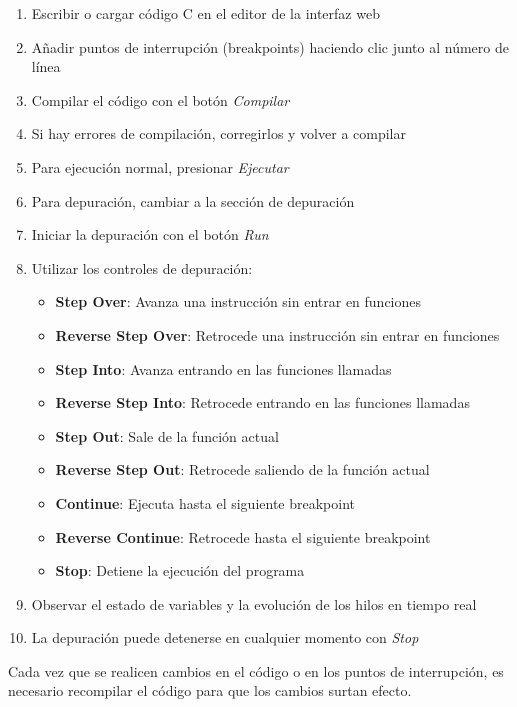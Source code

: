 \begin{enumerate}
    \item Escribir o cargar código C en el editor de la interfaz web
    \item Añadir puntos de interrupción (breakpoints) haciendo clic junto al número de línea
    \item Compilar el código con el botón \textit{Compilar}
    \item Si hay errores de compilación, corregirlos y volver a compilar
    \item Para ejecución normal, presionar \textit{Ejecutar}
    \item Para depuración, cambiar a la sección de depuración
    \item Iniciar la depuración con el botón \textit{Run}
    \item Utilizar los controles de depuración:
    \begin{itemize}
        \item \textbf{Step Over}: Avanza una instrucción sin entrar en funciones
        \item \textbf{Reverse Step Over}: Retrocede una instrucción sin entrar en funciones
        \item \textbf{Step Into}: Avanza entrando en las funciones llamadas
        \item \textbf{Reverse Step Into}: Retrocede entrando en las funciones llamadas
        \item \textbf{Step Out}: Sale de la función actual
        \item \textbf{Reverse Step Out}: Retrocede saliendo de la función actual
        \item \textbf{Continue}: Ejecuta hasta el siguiente breakpoint
        \item \textbf{Reverse Continue}: Retrocede hasta el siguiente breakpoint
        \item \textbf{Stop}: Detiene la ejecución del programa

    \end{itemize}
    \item Observar el estado de variables y la evolución de los hilos en tiempo real
    \item La depuración puede detenerse en cualquier momento con \textit{Stop}
\end{enumerate}

\begin{tcolorbox}[colback=yellow!10!white,colframe=red!50!black,title=\textbf{Importante}]
Cada vez que se realicen cambios en el código o en los puntos de interrupción, es necesario recompilar el código para que los cambios surtan efecto.
\end{tcolorbox}

